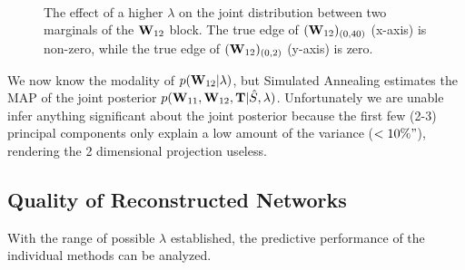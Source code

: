 \begin{figure}
	\centering
	\qquad\qquad\qquad\qquad\qquad\qquad\qquad\qquad\qquad \\
	\caption{The effect of a higher $\lambda$ on the joint distribution between two marginals of the $\mathbf{W}_{12}$ block. The true edge of $(\mathbf{W}_{12})_{(0,40)}$ (x-axis) is non-zero, while the true edge of $(\mathbf{W}_{12})_{(0,2)}$ (y-axis) is zero.}
	\label{fig:pca123}
\end{figure}


We now know the modality of $p(\mathbf{W}_{12} | \lambda)$, but Simulated Annealing estimates the MAP of the joint posterior $p(\mathbf{W}_{11}, \mathbf{W}_{12}, \mathbf{T} | \hat{S}, \lambda)$.
Unfortunately we are unable infer anything significant about the joint posterior because the first few (2-3) principal components only explain a low amount of the variance ($<10\%"$), rendering the 2 dimensional projection useless.





\subsection{Quality of Reconstructed Networks}
\label{ss:quality}
With the range of possible $\lambda$ established, the predictive performance of the individual methods can be analyzed.

